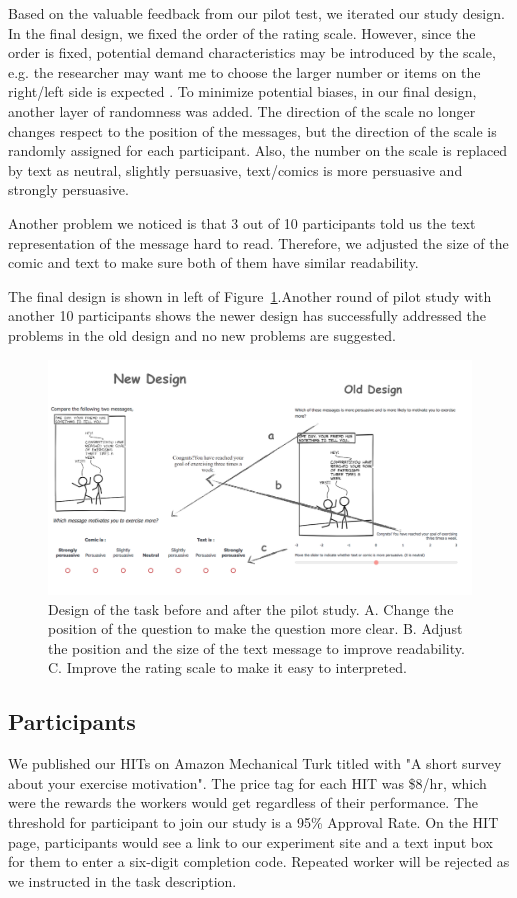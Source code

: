 Based on the valuable feedback from our pilot test, we iterated our study design. In the final design, we fixed the order of the rating scale. However, since the order is fixed, potential demand characteristics may be introduced by the scale, e.g. the researcher may want me to choose the larger number or items on the right/left side is expected \cite{orne1962social}. To minimize potential biases, in our final design, another layer of randomness was added. The direction of the scale no longer changes respect to the position of the messages, but the direction of the scale is randomly assigned for each participant. Also, the number on the scale is replaced by text as neutral, slightly persuasive, text/comics is more persuasive and strongly persuasive.

Another problem we noticed is that 3 out of 10 participants told us the text representation of the message hard to read. Therefore, we adjusted the size of the comic and text to make sure both of them have similar readability.

The final design is shown in left of Figure~\ref{fig:change}.Another round of pilot study with another 10 participants shows the newer design has successfully addressed the problems in the old design and no new problems are suggested.

\begin{figure}
  \centering
  \includegraphics[width=0.95\columnwidth]{figures/change}
  \caption{Design of the task before and after the pilot study. A. Change the position of the question to make the question more clear. B. Adjust the position and the size of the text message to improve readability. C. Improve the rating scale to make it easy to interpreted.}
  \label{fig:change}
\end{figure}


\subsection{Participants}
We published our HITs on Amazon Mechanical Turk titled with "A short survey about your exercise motivation". The price tag for each HIT was \$8/hr, which were the rewards the workers would get regardless of their performance. The threshold for participant to join our study is a 95\% Approval Rate. On the HIT page, participants would see a link to our experiment site and a text input box for them to enter a six-digit completion code. Repeated worker will be rejected as we instructed in the task description.\par
